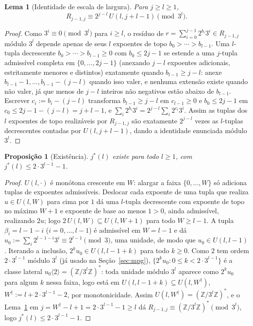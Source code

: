 \documentclass[11pt]{amsart}
\theoremstyle{plain}
\newtheorem{proposition}[theorem]{Proposi\c{c}\~ao}
\newtheorem{lemma}[theorem]{Lema}
\theoremstyle{definition}
\theoremstyle{remark}
\newcommand{\Z}{\mathbb{Z}}
\begin{document}
\begin{lemma}[Identidade de escala de largura]
\label{lem:UW}
Para $j\ge l\ge1$,
\begin{equation}
\label{eq:UW}
R_{j-1,j} \equiv 2^{j-l}\,U(l,j+l-1) \pmod{3^l}.
\end{equation}
\end{lemma}

\begin{proof}
Como $3^i\equiv0\pmod{3^l}$ para $i\ge l$, o resíduo de $r=\sum_{i=0}^{j-1}2^{b_i}3^i\in R_{j-1,j}$
módulo $3^l$ depende apenas de seus $l$ expoentes de topo $b_0>\cdots>b_{l-1}$. Uma $l$-tupla
decrescente $b_0>\cdots>b_{l-1}\ge0$ com $b_0\le2j-1$ se estende a uma $j$-tupla admissível
completa em $\{0,\dots,2j-1\}$ (anexando $j-l$ expoentes adicionais, estritamente menores e
distintos) exatamente quando $b_{l-1}\ge j-l$: anexe $b_{l-1}-1,\dots,b_{l-1}-(j-l)$ quando isso
valer, e nenhuma extensão existe quando não valer, já que menos de $j-l$ inteiros não negativos
estão abaixo de $b_{l-1}$. Escrever $c_i := b_i-(j-l)$ transforma $b_{l-1}\ge j-l$ em $c_{l-1}\ge0$
e $b_0\le2j-1$ em $c_0\le2j-1-(j-l)=j+l-1$, e $\sum_i2^{b_i}3^i = 2^{j-l}\sum_i2^{c_i}3^i$. Assim
as tuplas dos $l$ expoentes de topo realizáveis por $R_{j-1,j}$ são exatamente $2^{j-l}$ vezes as
$l$-tuplas decrescentes contadas por $U(l,j+l-1)$, dando a identidade enunciada módulo $3^l$.
\end{proof}

\begin{proposition}[Existência]
\label{prop:exist}
$j^*(l)$ existe para todo $l\ge1$, com $j^*(l)\le2\cdot3^{l-1}-1$.
\end{proposition}

\begin{proof}
$U(l,\cdot)$ é monótona crescente em $W$: alargar a faixa $\{0,\dots,W\}$ só adiciona tuplas de
expoentes admissíveis. Deslocar cada expoente de uma tupla que realiza $u\in U(l,W)$ para cima por
$1$ dá uma $l$-tupla decrescente com expoente de topo no máximo $W+1$ e expoente de base ao menos
$1>0$, ainda admissível, realizando $2u$; logo $2\,U(l,W)\subseteq U(l,W+1)$ para todo $W\ge l-1$.
A tupla $\beta_i=l-1-i$ ($i=0,\dots,l-1$) é admissível em $W=l-1$ e dá
$u_0:=\sum_i2^{l-1-i}3^i\equiv2^{l-1}\pmod3$, uma unidade, de modo que $u_0\in U(l,l-1)$. Iterando
a inclusão, $2^ku_0\in U(l,l-1+k)$ para todo $k\ge0$. Como $2$ tem ordem $2\cdot3^{l-1}$ módulo
$3^l$ (já usado na Seção~\ref{sec:mpg}), $\{2^ku_0 : 0\le k<2\cdot3^{l-1}\}$ é a classe lateral
$u_0\langle2\rangle=(\Z/3^l\Z)^*$: toda unidade módulo $3^l$ aparece como $2^ku_0$ para algum $k$
nessa faixa, logo está em $U(l,l-1+k)\subseteq U(l,W^\dagger)$, $W^\dagger:=l+2\cdot3^{l-1}-2$, por
monotonicidade. Assim $U(l,W^\dagger)=(\Z/3^l\Z)^*$, e o Lema~\ref{lem:UW} em
$j=W^\dagger-l+1=2\cdot3^{l-1}-1\ge l$ dá $R_{j-1,j}\equiv(\Z/3^l\Z)^*\pmod{3^l}$, logo
$j^*(l)\le2\cdot3^{l-1}-1$.
\end{proof}
\end{document}
